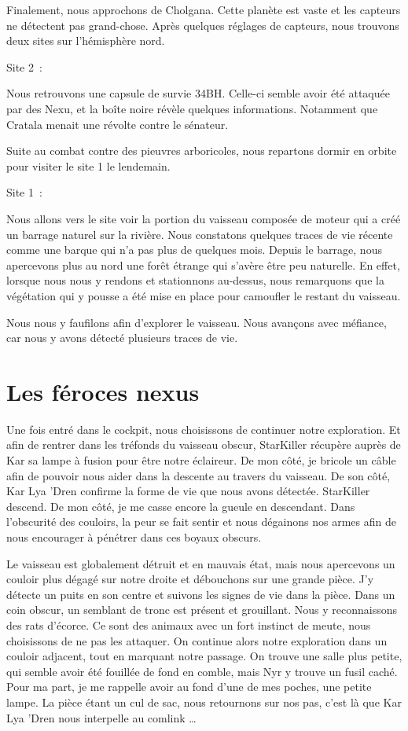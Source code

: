 \documentclass[a4paper,9pt,twoside,twocolumn,openany]{book}
\begin{document}
Finalement, nous approchons de Cholgana. Cette planète est vaste et les capteurs ne détectent pas grand-chose. Après quelques réglages de capteurs, nous trouvons deux sites sur l’hémisphère nord.

Site 2\ :

Nous retrouvons une capsule de survie 34BH. Celle-ci semble avoir été attaquée par des Nexu, et la boîte noire révèle quelques informations. Notamment que Cratala menait une révolte contre le sénateur.

Suite au combat contre des pieuvres arboricoles, nous repartons dormir en orbite pour visiter le site 1 le lendemain.

Site 1\ :

Nous allons vers le site voir la portion du vaisseau composée de moteur qui a créé un barrage naturel sur la rivière. Nous constatons quelques traces de vie récente comme une barque qui n’a pas plus de quelques mois. Depuis le barrage, nous apercevons plus au nord une forêt étrange qui s’avère être peu naturelle. En effet, lorsque nous nous y rendons et stationnons au-dessus, nous remarquons que la végétation qui y pousse a été mise en place pour camoufler le restant du vaisseau.

Nous nous y faufilons afin d’explorer le vaisseau. Nous avançons avec méfiance, car nous y avons détecté plusieurs traces de vie.

\section{Les féroces nexus}
\subtitle{01 octobre 2016}

Une fois entré dans le cockpit, nous choisissons de continuer notre exploration. Et afin de rentrer dans les tréfonds du vaisseau obscur, StarKiller récupère auprès de Kar sa lampe à fusion pour être notre éclaireur. De mon côté, je bricole un câble afin de pouvoir nous aider dans la descente au travers du vaisseau. De son côté, Kar Lya 'Dren confirme la forme de vie que nous avons détectée. StarKiller descend. De mon côté, je me casse encore la gueule en descendant. Dans l’obscurité des couloirs, la peur se fait sentir et nous dégainons nos armes afin de nous encourager à pénétrer dans ces boyaux obscurs.

Le vaisseau est globalement détruit et en mauvais état, mais nous apercevons un couloir plus dégagé sur notre droite et débouchons sur une grande pièce. J’y détecte un puits en son centre et suivons les signes de vie dans la pièce. Dans un coin obscur, un semblant de tronc est présent et grouillant. Nous y reconnaissons des rats d’écorce. Ce sont des animaux avec un fort instinct de meute, nous choisissons de ne pas les attaquer. On continue alors notre exploration dans un couloir adjacent, tout en marquant notre passage. On trouve une salle plus petite, qui semble avoir été fouillée de fond en comble, mais Nyr y trouve un fusil caché. Pour ma part, je me rappelle avoir au fond d’une de mes poches, une petite lampe. La pièce étant un cul de sac, nous retournons sur nos pas, c’est là que Kar Lya 'Dren nous interpelle au comlink …
\end{document}
